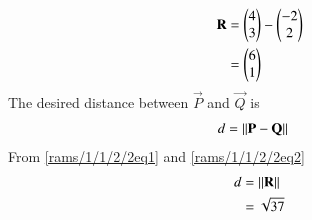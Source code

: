  
\begin{align}
    \mathbf{R}&=\begin{pmatrix}4\\3\end{pmatrix}-\begin{pmatrix}-2\\2\end{pmatrix}\\
 &=\begin{pmatrix}6\\1\end{pmatrix}\label{rams/1/1/2/2eq2}
\end{align}    
The desired distance between $\vec{P}$ and $\vec{Q}$ is 
%
\begin{align}
    d&=\left\lVert\mathbf{P}-\mathbf{Q}\right\rVert\label{rams/1/1/2/2eq1}
\end{align}
%
From \eqref{rams/1/1/2/2eq1} and \eqref{rams/1/1/2/2eq2}
\begin{align}
    d&=\left\lVert\mathbf{R}\right\rVert\\
    &=\sqrt{37}
\end{align}